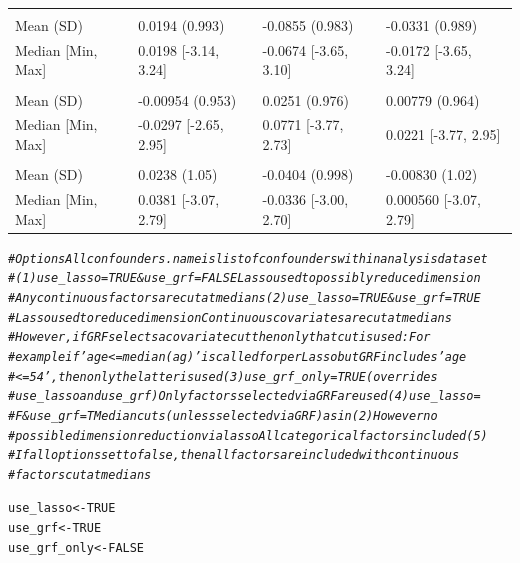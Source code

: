 \documentclass[12pt]{article}
\makeatletter
\newcommand{\hlnum}[1]{\textcolor[rgb]{0.686,0.059,0.569}{#1}}%
\newcommand{\hlcom}[1]{\textcolor[rgb]{0.678,0.584,0.686}{\textit{#1}}}%
\newcommand{\hlstd}[1]{\textcolor[rgb]{0.345,0.345,0.345}{#1}}%
\newcommand{\hlkwb}[1]{\textcolor[rgb]{0.69,0.353,0.396}{#1}}%
\newenvironment{kframe}{%
 \def\at@end@of@kframe{}%
 \ifinner\ifhmode%
  \def\at@end@of@kframe{\end{minipage}}%
  \begin{minipage}{\columnwidth}%
 \fi\fi%
 \def\FrameCommand##1{\hskip\@totalleftmargin \hskip-\fboxsep
 \colorbox{shadecolor}{##1}\hskip-\fboxsep
     \hskip-\linewidth \hskip-\@totalleftmargin \hskip\columnwidth}%
 \MakeFramed {\advance\hsize-\width
   \@totalleftmargin\z@ \linewidth\hsize
   \@setminipage}}%
 {\par\unskip\endMakeFramed%
 \at@end@of@kframe}
\newenvironment{knitrout}{}{} %
\makeatother
\begin{document}
\begin{knitrout}
\begin{tabular}[t]{llll}
\addlinespace[0.3em]
\multicolumn{4}{l}{\textbf{noise1}}\\
\hspace{1em}Mean (SD) & 0.0194 (0.993) & -0.0855 (0.983) & -0.0331 (0.989)\\
\hspace{1em}Median [Min, Max] & 0.0198 [-3.14, 3.24] & -0.0674 [-3.65, 3.10] & -0.0172 [-3.65, 3.24]\\
\addlinespace[0.3em]
\multicolumn{4}{l}{\textbf{noise2}}\\
\hspace{1em}Mean (SD) & -0.00954 (0.953) & 0.0251 (0.976) & 0.00779 (0.964)\\
\hspace{1em}Median [Min, Max] & -0.0297 [-2.65, 2.95] & 0.0771 [-3.77, 2.73] & 0.0221 [-3.77, 2.95]\\
\addlinespace[0.3em]
\multicolumn{4}{l}{\textbf{noise3}}\\
\hspace{1em}Mean (SD) & 0.0238 (1.05) & -0.0404 (0.998) & -0.00830 (1.02)\\
\hspace{1em}Median [Min, Max] & 0.0381 [-3.07, 2.79] & -0.0336 [-3.00, 2.70] & 0.000560 [-3.07, 2.79]\\
\bottomrule
\end{tabular}

\begin{kframe}\begin{alltt}
\hlcom{# Options Allconfounders.name is list of confounders within analysis dataset}
\hlcom{# (1) use_lasso=TRUE & use_grf=FALSE Lasso used to possibly reduce dimension}
\hlcom{# Any continuous factors are cut at medians (2) use_lasso=TRUE & use_grf=TRUE}
\hlcom{# Lasso used to reduce dimension Continuous covariates are cut at medians}
\hlcom{# However, if GRF selects a covariate cut then only that cut is used: For}
\hlcom{# example if 'age <= median(ag)' is called for per Lasso but GRF includes 'age}
\hlcom{# <= 54', then only the latter is used (3) use_grf_only = TRUE (overrides}
\hlcom{# use_lasso and use_grf) Only factors selected via GRF are used (4) use_lasso =}
\hlcom{# F & use_grf =T Median cuts (unless selected via GRF) as in (2) However no}
\hlcom{# possible dimension reduction via lasso All categorical factors included (5)}
\hlcom{# If all options set to false, then all factors are included with continuous}
\hlcom{# factors cut at medians}

\hlstd{use_lasso} \hlkwb{<-} \hlnum{TRUE}
\hlstd{use_grf} \hlkwb{<-} \hlnum{TRUE}
\hlstd{use_grf_only} \hlkwb{<-} \hlnum{FALSE}


\end{alltt}
\end{kframe}
\end{knitrout}
\end{document}
